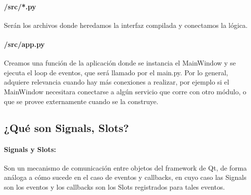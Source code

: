 \paragraph{/src/*.py} Ser\'an los archivos donde heredamos la interfaz compilada y conectamos la l\'ogica.

\paragraph{/src/app.py} Creamos una funci\'on de la aplicaci\'on donde se instancia el MainWindow y se ejecuta el loop de eventos,
que ser\'a llamado por el main.py. Por lo general, adquiere relevancia cuando hay m\'as conexiones a realizar, por ejemplo si el MainWindow
necesitara conectarse a alg\'un servicio que corre con otro m\'odulo, o que se provee externamente cuando se la construye.

\begin{center}
    \begin{minipage}{10cm}
    \end{minipage}
\end{center}

\subsection{¿Qu\'e son Signals, Slots?}
\label{signal_slot}

\paragraph{Signals y Slots:} Son un mecanismo de comunicaci\'on entre objetos del framework de Qt, de forma an\'aloga a c\'omo sucede en el caso de 
eventos y callbacks, en cuyo caso las Signals son los eventos y los callbacks son los Slots registrados para tales eventos.

